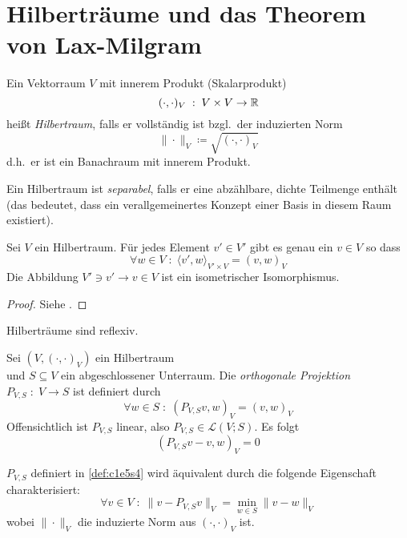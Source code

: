 \documentclass[../skript.tex]{subfiles}
\begin{document}
\section{Hilberträume und das Theorem von Lax-Milgram}

\begin{definition} %
\label{def:c1e5s1}
	Ein Vektorraum $V$ mit innerem Produkt (Skalarprodukt) 
	\[
		(\cdot,\cdot)_V \; : \; V\times V\to \mathbb{R}
	\]
	heißt \emph{Hilbertraum}, falls er vollständig ist bzgl.\ der induzierten Norm
	\[
		\| \cdot \|_V \coloneqq \sqrt{(\cdot,\cdot)_V}
	\]
	d.h.\ er ist ein Banachraum mit innerem Produkt.

	Ein Hilbertraum ist \emph{separabel}, falls er eine abzählbare, dichte Teilmenge enthält (das bedeutet, dass ein verallgemeinertes Konzept einer Basis in diesem Raum existiert).
\end{definition}

\begin{theorem} %
\label{thm:c1e5s2}
	Sei $V$ ein Hilbertraum. Für jedes Element $v'\in V'$ gibt es genau ein $v\in V$ so dass 
	\[
		\forall w\in V \; :\;\langle v', w \rangle_{V'\times V} = \left(v,w\right)_V
	\]
	Die Abbildung $V'\ni v'\to v\in V$ ist ein isometrischer Isomorphismus. 
\end{theorem}

\begin{proof}
	Siehe \cite[S.~90]{Yosida}.
\end{proof}

\begin{corollary} %
\label{thm:c1e5s3}
	Hilberträume sind reflexiv.
\end{corollary}

\begin{definition}
\label{def:c1e5s4}
	Sei $(V,(\cdot,\cdot)_V)$ ein Hilbertraum \\ und $S\subseteq V$ ein abgeschlossener Unterraum. Die \emph{orthogonale Projektion} $P_{V,S} \; : \; V\to S$ ist definiert durch
	\[
		\forall w\in S \; : \; \left(P_{V,S}v,w\right)_V = \left(v,w\right)_V
	\]
	Offensichtlich ist $P_{V,S}$ linear, also $P_{V,S}\in\mathcal{L}(V;S)$. Es folgt
	\[
		\left(P_{V,S}v-v,w\right)_V = 0
	\]
\end{definition}


\begin{proposition} %
\label{prop:c1e5s5}
	$P_{V,S}$ definiert in \cref{def:c1e5s4} wird äquivalent durch die folgende Eigenschaft charakterisiert:
	\[
		\forall v\in V\;:\;\| v-P_{V,S}v \|_V = \min_{w\in S} \| v-w \|_V 
	\]
	wobei $\|\cdot\|_V$ die induzierte Norm aus $(\cdot,\cdot)_V$ ist. 
\end{proposition}
\end{document}
